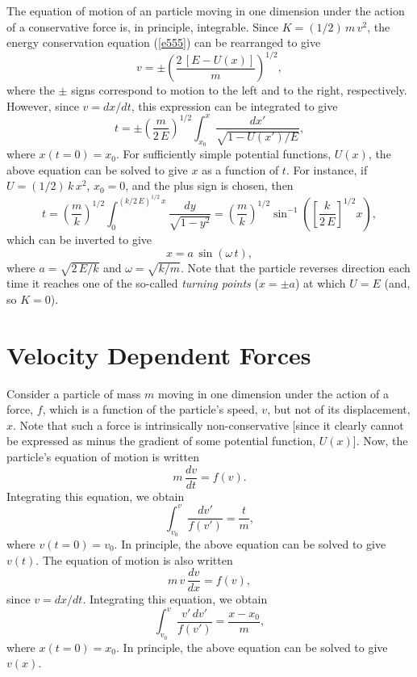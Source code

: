 The equation of motion of an particle moving in one dimension
under the action of a conservative force is, in principle, integrable. Since
$K=(1/2)\,m\,v^2$, the energy
conservation equation (\ref{e555}) can be rearranged to give
\begin{equation}
v = \pm\left(\frac{2\,[E-U(x)]}{m}\right)^{1/2},
\end{equation}
where the $\pm$ signs correspond to motion to the left and to the right, respectively. However, since
$v=dx/dt$, this expression can be integrated to give
\begin{equation}
t=\pm\left(\frac{m}{2\,E}\right)^{1/2} \int_{x_0}^x\frac{dx'}{\sqrt{1-U(x')/E}},
\end{equation}
where $x(t=0)=x_0$. For sufficiently simple potential functions, $U(x)$, the
above equation can be solved to give $x$ as a function of $t$.
For instance, if $U=(1/2)\,k\,x^2$,  $x_0=0$, and the plus sign is chosen, then
\begin{equation}
t = \left(\frac{m}{k}\right)^{1/2}\int_0^{(k/2\,E)^{1/2}\,x}\frac{dy}{\sqrt{1-y^2}}= \left(\frac{m}{k}\right)^{1/2} \sin^{-1}\left(\left[\frac{k}{2\,E}\right]^{1/2} x\right),
\end{equation}
which can be inverted to give
\begin{equation}
x = a\,\sin (\omega\,t),
\end{equation}
where $a = \sqrt{2\,E/k}$ and $\omega = \sqrt{k/m}$. 
Note that the particle reverses direction each time it reaches one of the so-called
{\em turning points}\/ ($x=\pm a$) at which $U=E$ (and, so $K=0$). 

\section{Velocity Dependent Forces}\label{svelyd}
Consider a particle of mass $m$ moving in one dimension under the
action of a force, $f$, which is a function of the particle's speed, $v$, but not
of its displacement, $x$. Note that such a force is intrinsically non-conservative [since it clearly cannot be expressed as minus the gradient of 
some potential function, $U(x)$]. 
Now, the particle's equation of motion is written
\begin{equation}
m\,\frac{dv}{dt} = f(v).
\end{equation}
Integrating this equation, we obtain
\begin{equation}
\int_{v_0}^v \frac{dv'}{f(v')} = \frac{t}{m},
\end{equation}
where $v(t=0)=v_0$. In principle, the above equation can be solved to
give $v(t)$. The equation of motion is also written
\begin{equation}
m\,v\,\frac{dv}{dx} = f(v),
\end{equation}
since $v=dx/dt$. Integrating this equation, we obtain
\begin{equation}
\int_{v_0}^v \frac{v'\,dv'}{f(v')} = \frac{x-x_0}{m},
\end{equation}
where $x(t=0) = x_0$. In principle, the above equation
can be solved to give $v(x)$. 

